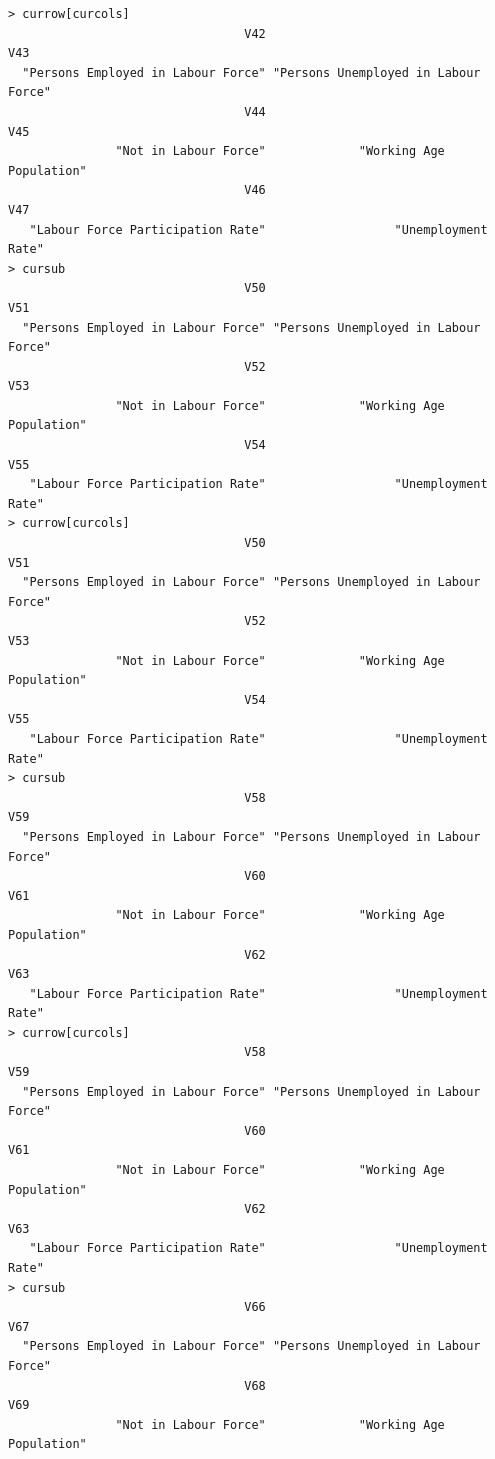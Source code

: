 \documentclass[a4paper]{article}
\begin{document}
\begin{verbatim}
> currow[curcols] 
                                 V42                                  V43 
  "Persons Employed in Labour Force" "Persons Unemployed in Labour Force" 
                                 V44                                  V45 
               "Not in Labour Force"             "Working Age Population" 
                                 V46                                  V47 
   "Labour Force Participation Rate"                  "Unemployment Rate" 
> cursub 
                                 V50                                  V51 
  "Persons Employed in Labour Force" "Persons Unemployed in Labour Force" 
                                 V52                                  V53 
               "Not in Labour Force"             "Working Age Population" 
                                 V54                                  V55 
   "Labour Force Participation Rate"                  "Unemployment Rate" 
> currow[curcols] 
                                 V50                                  V51 
  "Persons Employed in Labour Force" "Persons Unemployed in Labour Force" 
                                 V52                                  V53 
               "Not in Labour Force"             "Working Age Population" 
                                 V54                                  V55 
   "Labour Force Participation Rate"                  "Unemployment Rate" 
> cursub 
                                 V58                                  V59 
  "Persons Employed in Labour Force" "Persons Unemployed in Labour Force" 
                                 V60                                  V61 
               "Not in Labour Force"             "Working Age Population" 
                                 V62                                  V63 
   "Labour Force Participation Rate"                  "Unemployment Rate" 
> currow[curcols] 
                                 V58                                  V59 
  "Persons Employed in Labour Force" "Persons Unemployed in Labour Force" 
                                 V60                                  V61 
               "Not in Labour Force"             "Working Age Population" 
                                 V62                                  V63 
   "Labour Force Participation Rate"                  "Unemployment Rate" 
> cursub 
                                 V66                                  V67 
  "Persons Employed in Labour Force" "Persons Unemployed in Labour Force" 
                                 V68                                  V69 
               "Not in Labour Force"             "Working Age Population" 

\end{verbatim}
\end{document}
